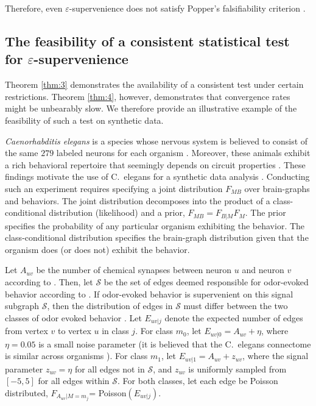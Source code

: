 \documentclass{article}
\newcommand{\eps}{\varepsilon}
\providecommand{\mc}[1]{\mathcal{#1}}
\begin{document}
Therefore, even $\eps$-supervenience does not satisfy Popper's falsifiability criterion \cite{Popper1959}.


\subsection*{The feasibility of a consistent statistical test for $\eps$-supervenience} %


Theorem \ref{thm:3} demonstrates the availability of a consistent test under certain restrictions.  Theorem \ref{thm:4}, however, demonstrates that convergence rates might be unbearably slow.  We therefore provide an illustrative example of the feasibility of such a test on synthetic data.

{\it Caenorhabditis elegans} is a species whose nervous system is believed to consist of the same $279$ labeled neurons for each organism \cite{Durbin87}. Moreover, these animals exhibit a rich behavioral repertoire that seemingly depends on circuit properties \cite{deBonoMaricq05}.  These findings motivate the use of C.~elegans for a synthetic data analysis \cite{GelmanShalizi11}.  Conducting such an experiment requires specifying a joint distribution $F_{MB}$ over brain-graphs and behaviors.  The joint distribution decomposes into the product of a class-conditional distribution (likelihood) and a prior, $F_{MB}=F_{B|M}F_M$. The prior  specifies the probability of any particular organism exhibiting the behavior.  The class-conditional distribution specifies the brain-graph distribution given that the organism does (or does not) exhibit the behavior. 

Let $A_{uv}$ be the number of chemical synapses between neuron $u$ and neuron $v$ according to \cite{VarshneyChklovskii09}.  Then, let $\mc{S}$ be the set of edges deemed responsible for odor-evoked behavior according to \cite{ChalasaniBargmann07}.  If odor-evoked behavior is supervenient on this signal subgraph $\mc{S}$, then the distribution of edges in $\mc{S}$ must differ between the two classes of odor evoked behavior \cite{VP11_sigsub}.  Let $E_{uv|j}$ denote the expected number of edges from vertex $v$ to vertex $u$ in class $j$.   For class $m_0$, let $E_{uv|0}=A_{uv}+\eta$,  where $\eta=0.05$ is a small noise parameter  (it is believed that the C.~elegans connectome is similar across organisms \cite{Durbin87}). For class $m_1$, let $E_{uv|1}=A_{uv}+z_{uv}$, where the signal parameter $z_{uv}=\eta$ for all edges not in $\mc{S}$, and $z_{uv}$ is uniformly sampled from $[-5,5]$ for all edges within $\mc{S}$. For both classes, let each edge be Poisson distributed, $F_{A_{uv}|M=m_j}$= Poisson$(E_{uv|j})$.
\end{document}
